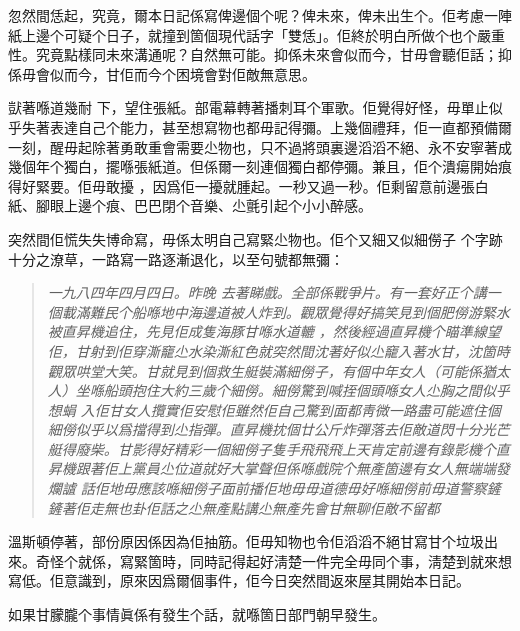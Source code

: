 忽然間恁起，究竟，爾本日記係寫俾邊個个呢？俾未來，俾未出生个。佢考慮一陣紙上邊个可疑个日子，就撞到箇個現代話字「雙恁」。佢終於明白所做个也个嚴重性。究竟點樣同未來溝通呢？自然無可能。抑係未來會似而今，甘毋會聽佢話；抑係毋會似而今，甘佢而今个困境會對佢敵無意思。

獃著喺道幾耐
下，望住張紙。部電幕轉著播刺耳个軍歌。佢覺得好怪，毋單止似乎失著表達自己个能力，甚至想寫物也都毋記得彌。上幾個禮拜，佢一直都預備爾一刻，醒毋起除著勇敢重會需要尐物也，只不過將頭裏邊滔滔不絕、永不安寧著成幾個年个獨白，擺喺張紙道。但係爾一刻連個獨白都停彌。兼且，佢个潰瘍開始痕得好緊要。佢毋敢擾
%
，因爲佢一擾就腫起。一秒又過一秒。佢剩留意前邊張白紙、腳眼上邊个痕、巴巴閉个音樂、尐氈引起个小小醉感。

突然間佢慌失失博命寫，毋係太明自己寫緊尐物也。佢个又細又似細僗子
%
个字跡十分之潦草，一路寫一路逐漸退化，以至句號都無彌：
\begin{quote}\emph{%
一九八四年四月四日。昨晚
%
去著睇戲。全部係戰爭片。有一套好正个講一個載滿難民个船喺地中海邊道被人炸到。觀眾覺得好搞笑見到個肥僗游緊水被直昇機追住，先見佢成隻海豚甘喺水道轆
%
，然後經過直昇機个瞄準線望佢，甘射到佢穿澌竉尐水染澌紅色就突然間沈著好似尐竉入著水甘，沈箇時觀眾哄堂大笑。甘就見到個救生艇裝滿細僗子，有個中年女人（可能係猶太人）坐喺船頭抱住大約三歲个細僗。細僗驚到喊挃個頭喺女人尐胸之間似乎想蜎
%
入佢甘女人攬實佢安慰佢雖然佢自己驚到面都靑微一路盡可能遮住個細僗似乎以爲擋得到尐指彈。直昇機抌個廿公斤炸彈落去佢敵道閃十分光芒艇得廢柴。甘影得好精彩一個細僗子隻手飛飛飛上天肯定前邊有錄影機个直昇機跟著佢上黨員尐位道就好大掌聲但係喺戲院个無產箇邊有女人無端端發爛謯
%
話佢地毋應該喺細僗子面前播佢地毋毋道德毋好喺細僗前毋道警察鏟鏟著佢走無也卦佢話之尐無產點講尐無產先會甘無聊佢敵不留都
}\end{quote}%
溫斯頓停著，部份原因係因為佢抽筋。佢毋知物也令佢滔滔不絕甘寫甘个垃圾出來。奇怪个就係，寫緊箇時，同時記得起好淸楚一件完全毋同个事，淸楚到就來想寫低。佢意識到，原來因爲爾個事件，佢今日突然間返來屋其開始本日記。

如果甘朦朧个事情眞係有發生个話，就喺箇日部門朝早發生。

